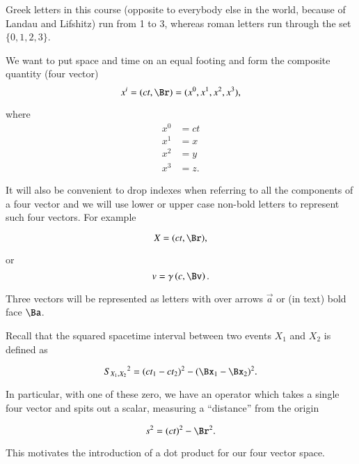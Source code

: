 Greek letters in this course (opposite to everybody else in the world, because of Landau and Lifshitz) run from 1 to 3, whereas roman letters run through the set $\{0,1,2,3\}$.

We want to put space and time on an equal footing and form the composite quantity (four vector) 
\begin{equation}\label{eqn:relativisticElectrodynamicsT1:40}
x^i = (ct, \Br) = (x^0, x^1, x^2, x^3),
\end{equation}

where
\begin{align}\label{eqn:relativisticElectrodynamicsT1:80}
x^0 &= ct \\
x^1 &= x \\
x^2 &= y \\
x^3 &= z.
\end{align}

It will also be convenient to drop indexes when referring to all the components of a four vector and we will use lower or upper case non-bold letters to represent such four vectors.  For example

\begin{equation}\label{eqn:relativisticElectrodynamicsT1:81}
X = (ct, \Br),
\end{equation}

or
\begin{equation}\label{eqn:relativisticElectrodynamicsT1:82}
v = \gamma \left(c, \Bv \right).
\end{equation}

Three vectors will be represented as letters with over arrows $\vec{a}$ or (in text) bold face $\Ba$.

Recall that the squared spacetime interval between two events $X_1$ and $X_2$ is defined as

\begin{equation}\label{eqn:relativisticElectrodynamicsT1:60}
{S_{X_1, X_2}}^2 = (ct_1 - c t_2)^2 - (\Bx_1 - \Bx_2)^2.
\end{equation}

In particular, with one of these zero, we have an operator which takes a single four vector and spits out a scalar, measuring a ``distance'' from the origin

\begin{equation}\label{eqn:relativisticElectrodynamicsT1:30}
s^2 = (ct)^2 - \Br^2.
\end{equation}

This motivates the introduction of a dot product for our four vector space.  

